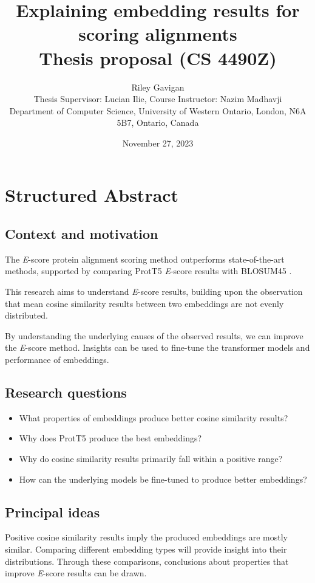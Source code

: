 \documentclass[
	letterpaper, %
	10pt, %
]{journalArticle}
\title{Explaining embedding results for scoring alignments\\ Thesis proposal (CS 4490Z)}
\author{
	Riley Gavigan\\\normalsize{Thesis Supervisor: Lucian Ilie, Course Instructor: Nazim Madhavji}\\\footnotesize{Department of Computer Science, University of Western Ontario, London, N6A 5B7, Ontario, Canada}
}
\date{November 27, 2023\\}
\begin{document}
\maketitle %
\section{Structured Abstract}

\subsection{Context and motivation}
The \textit{E}-score protein alignment scoring method \autocite{Ashrafzadeh:2023} outperforms state-of-the-art methods, supported by comparing ProtT5 \autocite{Elnaggar:2021} \textit{E}-score results with BLOSUM45 \autocite{Henikoff:1992}.

This research aims to understand \textit{E}-score results, building upon the observation that mean cosine similarity results between two embeddings are not evenly distributed.

By understanding the underlying causes of the observed results, we can improve the \textit{E}-score method. Insights can be used to fine-tune the transformer models \autocite{Elnaggar:2021, Rives:2021} and performance of embeddings.

\subsection{Research questions}
\begin{itemize}
    \item{What properties of embeddings produce better cosine similarity results?}
    \item{Why does ProtT5 produce the best embeddings?}
    \item{Why do cosine similarity results primarily fall within a positive range?}
    \item{How can the underlying models be fine-tuned to produce better embeddings?}
\end{itemize}

\subsection{Principal ideas}
Positive cosine similarity results imply the produced embeddings are mostly similar. Comparing different embedding types will provide insight into their distributions. Through these comparisons, conclusions about properties that improve \textit{E}-score results can be drawn.
\end{document}
